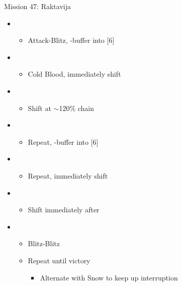 \begin{battle}{Mission 47: Raktavija}
	\begin{itemize}
		\item \first
			\begin{itemize}
				\item Attack-Blitz, \rav-buffer into [6]
			\end{itemize}
		\item \sixth
			\begin{itemize}
				\item Cold Blood, immediately shift
			\end{itemize}
		\item \third
			\begin{itemize}
				\item Shift at $\sim$120\% chain
			\end{itemize}
		\item \first
			\begin{itemize}
				\item Repeat, \rav-buffer into [6]
			\end{itemize}
		\item \sixth
			\begin{itemize}
				\item Repeat, immediately shift
			\end{itemize}	
		\item \third
			\begin{itemize}
				\item Shift immediately after \stagger
			\end{itemize}	
		\item \second
			\begin{itemize}
				\item Blitz-Blitz
				\item Repeat until victory
					\begin{itemize}
						\item Alternate with Snow to keep up interruption
					\end{itemize}
			\end{itemize}																			
	\end{itemize}
\end{battle}

